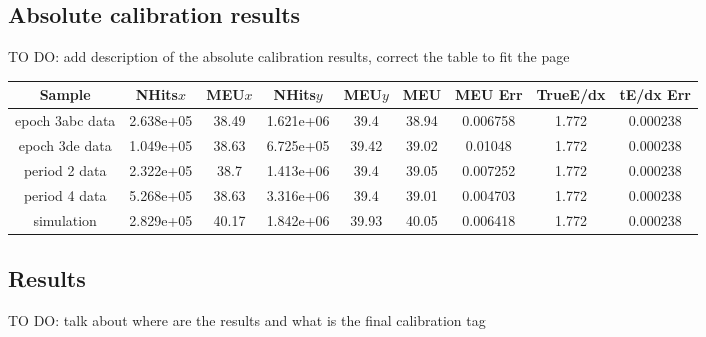 \documentclass[12pt,a4paper]{article}
\begin{document}
\FloatBarrier
\subsection{Absolute calibration results}
TO DO: add description of the absolute calibration results, correct the table to fit the page

\begin{center}
\begin{table}[h!]
\begin{tabular}{ |c|c|c|c|c|c|c|c|c|}
\hline
Sample & NHits$ x$ & MEU$ x$ & NHits$ y$ & MEU$ y$ & MEU & MEU Err & TrueE/dx & tE/dx Err\\ \hline
epoch 3abc data & 2.638e+05 & 38.49 & 1.621e+06 & 39.4 & 38.94 & 0.006758 & 1.772 & 0.000238\\ \hline
epoch 3de data & 1.049e+05 & 38.63 & 6.725e+05 & 39.42 & 39.02 & 0.01048 & 1.772 & 0.000238\\ \hline
period 2 data & 2.322e+05 & 38.7 & 1.413e+06 & 39.4 & 39.05 & 0.007252 & 1.772 & 0.000238\\ \hline
period 4 data & 5.268e+05 & 38.63 & 3.316e+06 & 39.4 & 39.01 & 0.004703 & 1.772 & 0.000238\\ \hline
simulation & 2.829e+05 & 40.17 & 1.842e+06 & 39.93 & 40.05 & 0.006418 & 1.772 & 0.000238\\ \hline
\end{tabular}
\label{tab:calib_summary_table}
\end{table}
\end{center}

\subsection{Results}
TO DO: talk about where are the results and what is the final calibration tag
\end{document}
